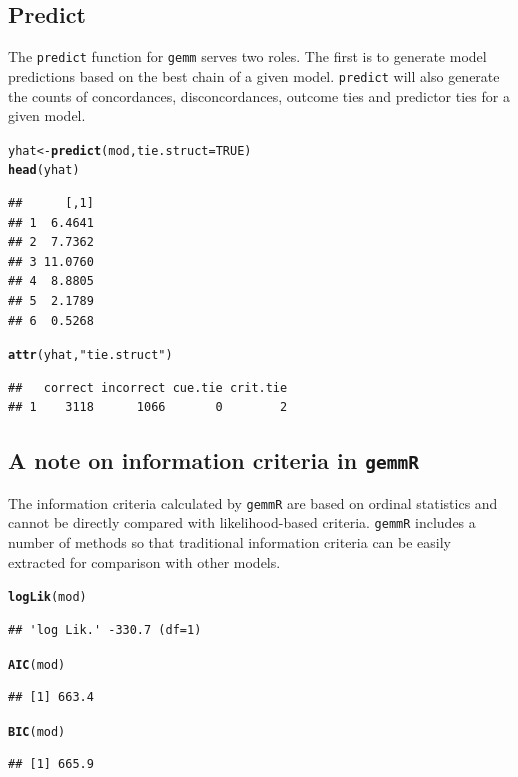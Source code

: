 \documentclass{article}\usepackage[]{graphicx}\usepackage[]{color}
\makeatletter
\newcommand{\hlnum}[1]{\textcolor[rgb]{0.686,0.059,0.569}{#1}}%
\newcommand{\hlstr}[1]{\textcolor[rgb]{0.192,0.494,0.8}{#1}}%
\newcommand{\hlstd}[1]{\textcolor[rgb]{0.345,0.345,0.345}{#1}}%
\newcommand{\hlkwb}[1]{\textcolor[rgb]{0.69,0.353,0.396}{#1}}%
\newcommand{\hlkwc}[1]{\textcolor[rgb]{0.333,0.667,0.333}{#1}}%
\newcommand{\hlkwd}[1]{\textcolor[rgb]{0.737,0.353,0.396}{\textbf{#1}}}%
\newenvironment{kframe}{%
 \def\at@end@of@kframe{}%
 \ifinner\ifhmode%
  \def\at@end@of@kframe{\end{minipage}}%
  \begin{minipage}{\columnwidth}%
 \fi\fi%
 \def\FrameCommand##1{\hskip\@totalleftmargin \hskip-\fboxsep
 \colorbox{shadecolor}{##1}\hskip-\fboxsep
     \hskip-\linewidth \hskip-\@totalleftmargin \hskip\columnwidth}%
 \MakeFramed {\advance\hsize-\width
   \@totalleftmargin\z@ \linewidth\hsize
   \@setminipage}}%
 {\par\unskip\endMakeFramed%
 \at@end@of@kframe}
\newenvironment{knitrout}{}{} %
\makeatother
\begin{document}
\subsection*{Predict}

The \texttt{predict} function for \texttt{gemm} serves two roles.
The first is to generate model predictions based on the best chain of a given model.
\texttt{predict} will also generate the counts of concordances, disconcordances, outcome ties and predictor ties for a given model.

\begin{knitrout}
\color{fgcolor}\begin{kframe}
\begin{alltt}
\hlstd{yhat} \hlkwb{<-} \hlkwd{predict}\hlstd{(mod,} \hlkwc{tie.struct} \hlstd{=} \hlnum{TRUE}\hlstd{)}
\hlkwd{head}\hlstd{(yhat)}
\end{alltt}
\begin{verbatim}
##      [,1]
## 1  6.4641
## 2  7.7362
## 3 11.0760
## 4  8.8805
## 5  2.1789
## 6  0.5268
\end{verbatim}
\begin{alltt}
\hlkwd{attr}\hlstd{(yhat,} \hlstr{"tie.struct"}\hlstd{)}
\end{alltt}
\begin{verbatim}
##   correct incorrect cue.tie crit.tie
## 1    3118      1066       0        2
\end{verbatim}
\end{kframe}
\end{knitrout}

\subsection*{A note on information criteria in \texttt{gemmR}}

The information criteria calculated by \texttt{gemmR} are based on ordinal statistics and cannot be directly compared with likelihood-based criteria.
\texttt{gemmR} includes a number of methods so that traditional information criteria can be easily extracted for comparison with other models.

\begin{knitrout}
\color{fgcolor}\begin{kframe}
\begin{alltt}
\hlkwd{logLik}\hlstd{(mod)}
\end{alltt}
\begin{verbatim}
## 'log Lik.' -330.7 (df=1)
\end{verbatim}
\begin{alltt}
\hlkwd{AIC}\hlstd{(mod)}
\end{alltt}
\begin{verbatim}
## [1] 663.4
\end{verbatim}
\begin{alltt}
\hlkwd{BIC}\hlstd{(mod)}
\end{alltt}
\begin{verbatim}
## [1] 665.9
\end{verbatim}
\end{kframe}
\end{knitrout}



\end{document}
